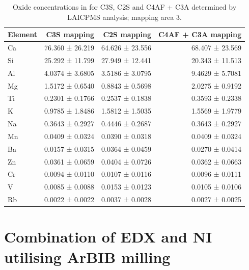 \begin{table}[!htb]
	\caption{
		Oxide concentrations in \unit{\wtpercent} for \ac{C3S}, \ac{C2S} and \ac{C4AF} + \ac{C3A} determined by \ac{LAICPMS} analysis; mapping area \num{3}.
	}
	\label{tab:laicpms2-area3}
	\begin{tabular*}{\linewidth}{@{\extracolsep{\fill}} lrrr}
	\toprule
	Element & \ac{C3S} mapping & \ac{C2S} mapping & \ac{C4AF} + \ac{C3A} mapping \\ \midrule
	Ca & 76.360 ± 26.219 & 64.626 ± 23.556 & 68.407 ± 23.569 \\
	Si & 25.292 ± 11.799 & 27.949 ± 12.441 & 20.343 ± 11.513 \\
	Al & 4.0374 ± 3.6805 & 3.5186 ± 3.0795 & 9.4629 ± 5.7081 \\
	Mg & 1.5172 ± 0.6540 & 0.8843 ± 0.5698 & 2.0275 ± 0.9192 \\
	Ti & 0.2301 ± 0.1766 & 0.2537 ± 0.1838 & 0.3593 ± 0.2338 \\
	K & 0.9785 ± 1.8486 & 1.5812 ± 1.5035 & 1.5569 ± 1.9779 \\
	Na & 0.3643 ± 0.2927 & 0.4446 ± 0.2687 & 0.3643 ± 0.2927 \\
	Mn & 0.0409 ± 0.0324 & 0.0390 ± 0.0318 & 0.0409 ± 0.0324 \\
	Ba & 0.0157 ± 0.0315 & 0.0364 ± 0.0459 & 0.0270 ± 0.0414 \\
	Zn & 0.0361 ± 0.0659 & 0.0404 ± 0.0726 & 0.0362 ± 0.0663 \\
	Cr & 0.0094 ± 0.0110 & 0.0107 ± 0.0116 & 0.0096 ± 0.0111 \\
	V & 0.0085 ± 0.0088 & 0.0153 ± 0.0123 & 0.0105 ± 0.0106 \\
	Rb & 0.0022 ± 0.0022 & 0.0037 ± 0.0028 & 0.0027 ± 0.0025 \\ \bottomrule 
	\end{tabular*}
\end{table}


\FloatBarrier
\section{Combination of \acs*{EDX} and \acl{NI} utilising \acs*{ArBIB}
milling}


